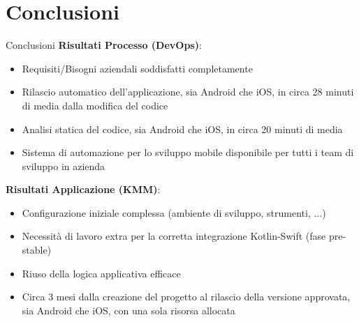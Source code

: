 
\section{Conclusioni}

\begin{frame}{Conclusioni}
    \textbf{Risultati Processo (DevOps)}:
    \begin{itemize}
        \item Requisiti/Bisogni aziendali soddisfatti completamente
        \item Rilascio automatico dell'applicazione, sia Android che iOS, in circa 28 minuti di media dalla modifica del codice
        \item Analisi statica del codice, sia Android che iOS, in circa 20 minuti di media
        \item Sistema di automazione per lo sviluppo mobile disponibile per tutti i team di sviluppo in azienda
    \end{itemize}
    \vspace{2mm}
    \textbf{Risultati Applicazione (KMM)}:
    \begin{itemize}
        \item Configurazione iniziale complessa (ambiente di sviluppo, strumenti, ...)
        \item Necessità di lavoro extra per la corretta integrazione Kotlin-Swift (fase pre-stable)
        \item Riuso della logica applicativa efficace
        \item Circa 3 mesi dalla creazione del progetto al rilascio della versione approvata, sia Android che iOS, con una sola risorsa allocata
    \end{itemize}
\end{frame}